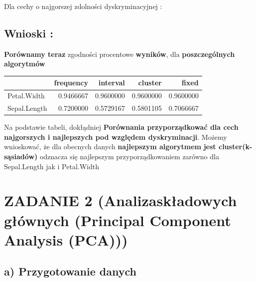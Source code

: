 \documentclass[
  12pt,
]{article}
\begin{document}
Dla cechy o najgorszej zdolności dyskryminacyjnej :

\subsection{Wnioski :}\label{wnioski}

\textbf{Porównamy teraz} zgodności procentowe \textbf{wyników}, dla
\textbf{poszczególnych algorytmów}

\begin{longtable}[]{@{}lrrrr@{}}
\toprule\noalign{}
& frequency & interval & cluster & fixed \\
\midrule\noalign{}
\endhead
\bottomrule\noalign{}
\endlastfoot
Petal.Width & 0.9466667 & 0.9600000 & 0.9600000 & 0.9600000 \\
Sepal.Length & 0.7200000 & 0.5729167 & 0.5801105 & 0.7066667 \\
\end{longtable}

Na podstawie tabeli, dokłądniej \textbf{Porównania przyporządkować dla
cech najgorszych i najlepszych pod względem dyskryminacji}. Możemy
wnioskować, że dla obecnych danych \textbf{najlepszym algorytmem}
\textbf{jest cluster(k-sąsiadów)} odznacza się najlepszym
przyporządkowaniem zarówno dla Sepal.Length jak i Petal.Width

\section{ZADANIE 2 (Analizaskładowych głównych (Principal Component
Analysis
(PCA)))}\label{zadanie-2-analizaskux142adowych-gux142uxf3wnych-principal-component-analysis-pca}

\subsection{a) Przygotowanie danych}\label{a-przygotowanie-danych}
\end{document}
